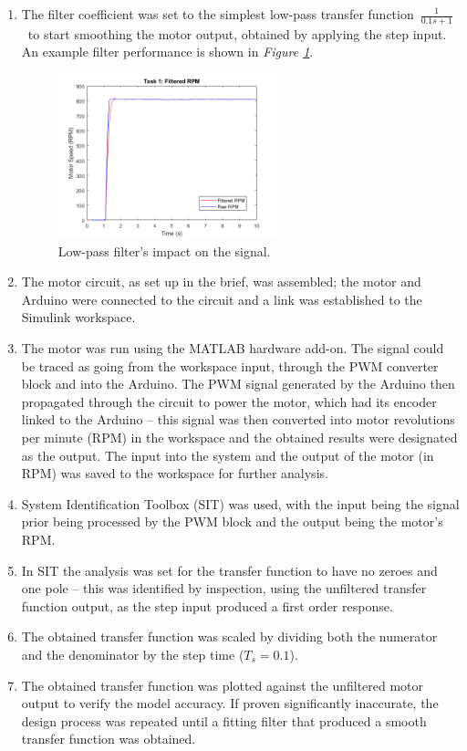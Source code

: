 \documentclass[11pt, onecolumn]{article}
\begin{document}
\begin{enumerate}
    \item The filter coefficient was set to the simplest low-pass transfer function $\frac{1}{0.1s+1}$ to start smoothing the motor output, obtained by applying the step input. An example filter performance is shown in \textit{Figure \ref{fig:q1-filter}}.
          \begin{figure}[h!]
              \centering
              \includegraphics[width=0.6\textwidth]{q1-filter.png}
              \caption{Low-pass filter's impact on the signal.}
              \label{fig:q1-filter}
          \end{figure}
    \item The motor circuit, as set up in the brief, was assembled; the motor and Arduino were connected to the circuit and a link was established to the Simulink workspace.
    \item The motor was run using the MATLAB hardware add-on. The signal could be traced as going from the workspace input, through the PWM converter block and into the Arduino. The PWM signal generated by the Arduino then propagated through the circuit to power the motor, which had its encoder linked to the Arduino – this signal was then converted into motor revolutions per minute (RPM) in the workspace and the obtained results were designated as the output. The input into the system and the output of the motor (in RPM) was saved to the workspace for further analysis.
    \item System Identification Toolbox (SIT) was used, with the input being the signal prior being processed by the PWM block and the output being the motor's RPM.
    \item In SIT the analysis was set for the transfer function to have no zeroes and one pole – this was identified by inspection, using the unfiltered transfer function output, as the step input produced a first order response.
    \item The obtained transfer function was scaled by dividing both the numerator and the denominator by the step time ($T_s = 0.1$).
    \item The obtained transfer function was plotted against the unfiltered motor output to verify the model accuracy. If proven significantly inaccurate, the design process was repeated until a fitting filter that produced a smooth transfer function was obtained.
\end{enumerate}
\end{document}
